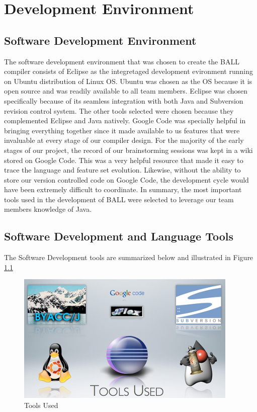 \chapter{Development Environment}\label{DevelEnv}

\section{Software Development Environment}

The software development environment that was chosen to create the
BALL compiler consists of Eclipse as the integretaged development evironment 
running on Ubuntu distribution of Linux OS. Ubuntu was chosen as the 
OS because it is open source and was readily available to all team members. 
Eclipse was chosen specifically because of its seamless integration with 
both Java and Subversion revision control system. The other tools selected
were chosen because they complemented Eclipse and Java natively.
Google Code was specially helpful in bringing everything
together since it made available to us features that were invaluable
at every stage of our compiler design. For the majority of the early
stages of our project, the record of our brainstorming sessions was
kept in a wiki stored on Google Code. This was a very helpful resource
that made it easy to trace the language and feature set
evolution. Likewise, without the ability to store our version
controlled code on Google Code, the development cycle would have been
extremely difficult to coordinate. In summary, the most important tools
used in the development of BALL were selected to leverage our team
members knowledge of Java.

\section{Software Development and Language Tools}
The Software Development tools are summarized below and illustrated in Figure \ref{toolsdiagram}

\begin{figure}[htbp]
  \centering
  \includegraphics[scale=0.99]{softdevtools2.png}
  \caption{Tools Used}
  \label{toolsdiagram}
\end{figure}


